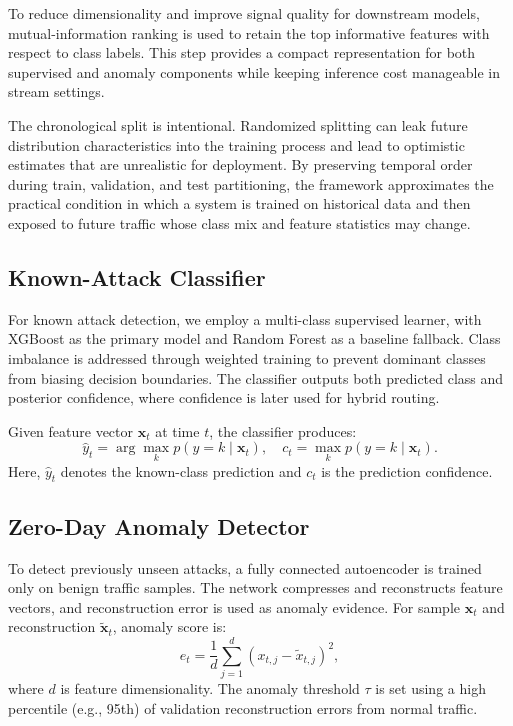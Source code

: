 \documentclass[conference]{IEEEtran}
\begin{document}
To reduce dimensionality and improve signal quality for downstream models, mutual-information ranking is used to retain the top informative features with respect to class labels. This step provides a compact representation for both supervised and anomaly components while keeping inference cost manageable in stream settings.

The chronological split is intentional. Randomized splitting can leak future distribution characteristics into the training process and lead to optimistic estimates that are unrealistic for deployment. By preserving temporal order during train, validation, and test partitioning, the framework approximates the practical condition in which a system is trained on historical data and then exposed to future traffic whose class mix and feature statistics may change.

\subsection{Known-Attack Classifier}
For known attack detection, we employ a multi-class supervised learner, with XGBoost as the primary model and Random Forest as a baseline fallback. Class imbalance is addressed through weighted training to prevent dominant classes from biasing decision boundaries. The classifier outputs both predicted class and posterior confidence, where confidence is later used for hybrid routing.

Given feature vector $\mathbf{x}_t$ at time $t$, the classifier produces:
\begin{equation}
\hat{y}_t = \arg\max_k p(y=k \mid \mathbf{x}_t), \quad
c_t = \max_k p(y=k \mid \mathbf{x}_t).
\end{equation}
Here, $\hat{y}_t$ denotes the known-class prediction and $c_t$ is the prediction confidence.

\subsection{Zero-Day Anomaly Detector}
To detect previously unseen attacks, a fully connected autoencoder is trained only on benign traffic samples. The network compresses and reconstructs feature vectors, and reconstruction error is used as anomaly evidence. For sample $\mathbf{x}_t$ and reconstruction $\tilde{\mathbf{x}}_t$, anomaly score is:
\begin{equation}
e_t = \frac{1}{d}\sum_{j=1}^{d}(x_{t,j}-\tilde{x}_{t,j})^2,
\end{equation}
where $d$ is feature dimensionality. The anomaly threshold $\tau$ is set using a high percentile (e.g., 95th) of validation reconstruction errors from normal traffic.
\end{document}
